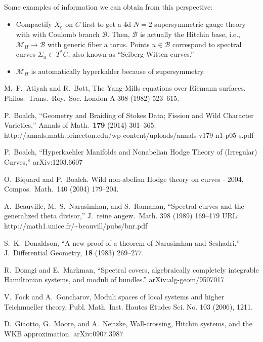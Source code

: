 \documentclass[oneside,english]{amsbook}
\numberwithin{section}{chapter}
\numberwithin{equation}{section}
\numberwithin{figure}{section}
\theoremstyle{plain}
\theoremstyle{definition}
\theoremstyle{remark}
\theoremstyle{definition}
\theoremstyle{definition}
\theoremstyle{plain}
\begin{document}
Some examples of information we can obtain from this perspective:
\begin{itemize}
\item Compactify $X_{\mathfrak{g}}$ on $C$ first to get a 4d $N=2$ supersymmetric
gauge theory with with Coulomb branch $\mathcal{B}$. Then, $\mathcal{B}$
is actually the Hitchin base, i.e., $\mathcal{M}_{H}\rightarrow\mathcal{B}$
with generic fiber a torus. Points $u\in\mathcal{B}$ correspond to
spectral curves $\Sigma_{u}\subset T^{*}C$, also known as ``Seiberg-Witten
curves.''
\item $\mathcal{M}_{H}$ is automatically hyperkahler because of supersymmetry.
\end{itemize}

\begin{thebibliography}{AB}
M.~F.~Atiyah and R.~Bott, The Yang-Mills equations
over Riemann surfaces. Philos.~Trans.~Roy.~Soc. London A 308 (1982)
523--615.

P.~Boalch, ``Geometry and Braiding of Stokes Data;
Fission and Wild Character Varieties,'' Annals of Math.~\textbf{179}
(2014) 301--365. http://annals.math.princeton.edu/wp-content/uploads/annals-v179-n1-p05-s.pdf

P.~Boalch, ``Hyperkaehler Manifolds and Nonabelian
Hodge Theory of (Irregular) Curves,'' arXiv:1203.6607

O.~Biquard and P.~Boalch. Wild non-abelian Hodge
theory on curves - 2004, Compos.~Math.~140 (2004) 179--204.

A.~Beauville, M.~S.~Narasimhan, and S.~Ramanan,
``Spectral curves and the generalized theta divisor,'' J.~reine
angew.~Math. 398 (1989) 169--179 URL: http://math1.unice.fr/\textasciitilde{}beauvill/pubs/bnr.pdf

S.~K.~Donaldson, ``A new proof of a theorem of Narasimhan
and Seshadri,'' J.~Differential Geometry, \textbf{18} (1983) 269--277.

R.~Donagi and E.~Markman, ``Spectral covers, algebraically
completely integrable Hamiltonian systems, and moduli of bundles.''
arXiv:alg-geom/9507017

V.~Fock and A.~Goncharov, Moduli spaces of local
systems and higher Teichmueller theory, Publ. Math. Inst. Hautes Etudes
Sci. No. 103 (2006), 1\textendash{}211.

 D.~Giaotto, G.~Moore, and A.~Neitzke, Wall-crossing,
Hitchin systems, and the WKB approximation. arXiv:0907.3987


\end{thebibliography}
\end{document}
